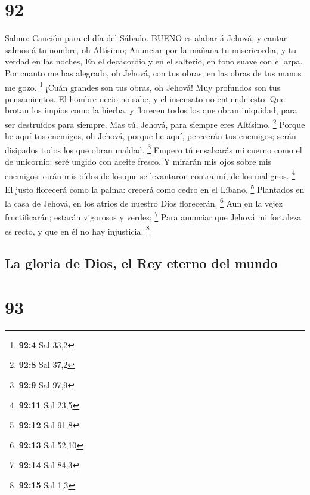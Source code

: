 \hypertarget{section-91}{%
\section{92}\label{section-91}}

 Salmo: Canción para el día del Sábado. BUENO es alabar á
Jehová, y cantar salmos á tu nombre, oh Altísimo;  Anunciar
por la mañana tu misericordia, y tu verdad en las noches, 
En el decacordio y en el salterio, en tono suave con el arpa.
 Por cuanto me has alegrado, oh Jehová, con tus obras; en
las obras de tus manos me gozo. \footnote{\textbf{92:4} Sal 33,2}
 ¡Cuán grandes son tus obras, oh Jehová! Muy profundos son
tus pensamientos.  El hombre necio no sabe, y el insensato
no entiende esto:  Que brotan los impíos como la hierba, y
florecen todos los que obran iniquidad, para ser destruídos para
siempre.  Mas tú, Jehová, para siempre eres Altísimo.
\footnote{\textbf{92:8} Sal 37,2}  Porque he aquí tus
enemigos, oh Jehová, porque he aquí, perecerán tus enemigos; serán
disipados todos los que obran maldad. \footnote{\textbf{92:9} Sal 97,9}
 Empero tú ensalzarás mi cuerno como el de unicornio: seré
ungido con aceite fresco.  Y mirarán mis ojos sobre mis
enemigos: oirán mis oídos de los que se levantaron contra mí, de los
malignos. \footnote{\textbf{92:11} Sal 23,5}  El justo
florecerá como la palma: crecerá como cedro en el Líbano. \footnote{\textbf{92:12}
  Sal 91,8}  Plantados en la casa de Jehová, en los atrios
de nuestro Dios florecerán. \footnote{\textbf{92:13} Sal 52,10}
 Aun en la vejez fructificarán; estarán vigorosos y verdes;
\footnote{\textbf{92:14} Sal 84,3}  Para anunciar que
Jehová mi fortaleza es recto, y que en él no hay injusticia. \footnote{\textbf{92:15}
  Sal 1,3}

\hypertarget{la-gloria-de-dios-el-rey-eterno-del-mundo}{%
\subsection{La gloria de Dios, el Rey eterno del
mundo}\label{la-gloria-de-dios-el-rey-eterno-del-mundo}}

\hypertarget{section-92}{%
\section{93}\label{section-92}}

